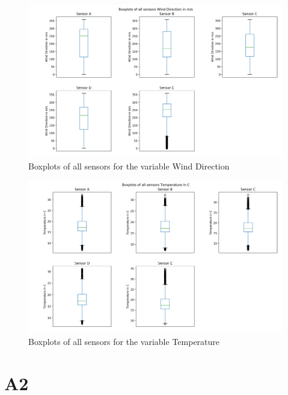 \documentclass{article}
\begin{document}
        \begin{figure}[H]
            \includegraphics[width=\textwidth]{boxplot_winddirection}
            \caption{Boxplots of all sensors for the variable Wind Direction}
        \end{figure}
        
        \begin{figure}[H]
            \includegraphics[width=\textwidth]{boxplot_temperature}
            \caption{Boxplots of all sensors for the variable Temperature}
        \end{figure}
        

\section{A2}
\end{document}
